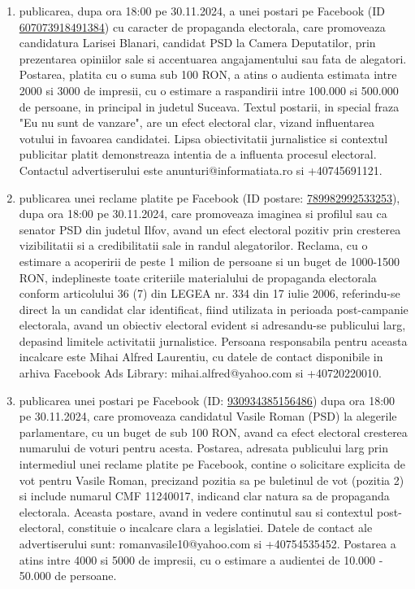 \documentclass[a4paper,12pt]{article}
\begin{document}
\begin{enumerate}[leftmargin=*, label=\arabic*.)]
    \item publicarea, dupa ora 18:00 pe 30.11.2024, a unei postari pe Facebook (ID \href{https://www.facebook.com/ads/library/?id=607073918491384}{607073918491384}) cu caracter de propaganda electorala, care promoveaza candidatura Larisei Blanari, candidat PSD la Camera Deputatilor,  prin prezentarea opiniilor sale si accentuarea angajamentului sau fata de alegatori.  Postarea, platita cu o suma sub 100 RON, a atins o audienta estimata intre 2000 si 3000 de impresii, cu o estimare a raspandirii intre 100.000 si 500.000 de persoane, in principal in judetul Suceava.  Textul postarii, in special fraza "Eu nu sunt de vanzare", are un efect electoral clar, vizand influentarea votului in favoarea candidatei.  Lipsa obiectivitatii jurnalistice si contextul publicitar platit demonstreaza intentia de a influenta procesul electoral.  Contactul advertiserului este anunturi@informatiata.ro si +40745691121.
    \item publicarea unei reclame platite pe Facebook (ID postare: \href{https://www.facebook.com/ads/library/?id=789982992533253}{789982992533253}), dupa ora 18:00 pe 30.11.2024, care promoveaza imaginea si profilul sau ca senator PSD din judetul Ilfov, avand un efect electoral pozitiv prin cresterea vizibilitatii si a credibilitatii sale in randul alegatorilor. Reclama, cu o estimare a acoperirii de peste 1 milion de persoane si un buget de 1000-1500 RON, indeplineste toate criteriile materialului de propaganda electorala conform articolului 36 (7) din LEGEA nr. 334 din 17 iulie 2006, referindu-se direct la un candidat clar identificat, fiind utilizata in perioada post-campanie electorala, avand un obiectiv electoral evident si adresandu-se publicului larg, depasind limitele activitatii jurnalistice.  Persoana responsabila pentru aceasta incalcare este Mihai Alfred Laurentiu, cu datele de contact disponibile in arhiva Facebook Ads Library: mihai.alfred@yahoo.com si +40720220010.
    \item publicarea unei postari pe Facebook (ID: \href{https://www.facebook.com/ads/library/?id=930934385156486}{930934385156486}) dupa ora 18:00 pe 30.11.2024, care promoveaza candidatul Vasile Roman (PSD) la alegerile parlamentare,  cu un buget de sub 100 RON,  avand ca efect electoral cresterea numarului de voturi pentru acesta. Postarea, adresata publicului larg prin intermediul unei reclame platite pe Facebook, contine o solicitare explicita de vot pentru Vasile Roman, precizand pozitia sa pe buletinul de vot (pozitia 2) si include numarul CMF 11240017, indicand clar natura sa de propaganda electorala.  Aceasta postare, avand in vedere continutul sau si contextul post-electoral, constituie o incalcare clara a legislatiei.  Datele de contact ale advertiserului sunt: romanvasile10@yahoo.com si +40754535452.  Postarea a atins intre 4000 si 5000 de impresii, cu o estimare a audientei de 10.000 - 50.000 de persoane.
\end{enumerate}
\end{document}
